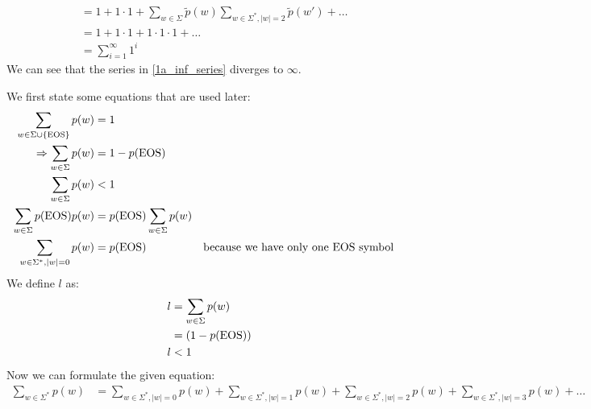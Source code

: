 \documentclass[a4paper,12pt]{ETHexercise}
\begin{document}
\begin{question}
\begin{subquestion}
\begin{align}
			                                   & = 1 + 1 \cdot 1 + \sum_{w \in \Sigma} \tilde{p}(w) \sum_{w \in \Sigma^*, |w|=2} \tilde{p}(w') + \dots                                       \\
			                                   & = 1 + 1 \cdot 1 + 1 \cdot 1 \cdot 1 + \dots                                                                                                 \\
			                                   & = \sum_{i=1}^{\infty} 1^{i}                                                                                         \label{1a_inf_series}
		\end{align}
		We can see that the series in \eqref{1a_inf_series} diverges to $\infty$.
	\end{subquestion}
	\begin{subquestion}
		We first state some equations that are used later:
		\begin{align}
			\sum_{w \in \Sigma \cup \{\text{EOS}\}} p(w) & = 1 \label{1b_sum_p}                                                                                 \\
			\Rightarrow \sum_{w \in \Sigma} p(w)   & = 1 - p(\text{EOS})                                                                                        \\
			\sum_{w \in \Sigma} p(w)               & < 1                                                                                                  \\
			\sum_{w \in \Sigma} p(\text{EOS})p(w)        & = p(\text{EOS}) \sum_{w \in \Sigma} p(w)                                                                   \\
			\sum_{w \in \Sigma^*, |w|=0} p(w)      & = p(\text{EOS})                          &  & \text{because we have only one EOS symbol} \label{1b_sum_p0} \\
		\end{align}
		We define $l$ as:
		\begin{align}
			l & = \sum_{w \in \Sigma} p(w) \label{1b_def_l} \\
			  & = (1 - p(\text{EOS})) \label{1b_def_l2}           \\
			l & < 1
		\end{align}
		Now we can formulate the given equation:
		\begin{align}
			\sum_{w \in \Sigma^*} p(w) & =  \sum_{w \in \Sigma^*, |w|=0} p(w) + \sum_{w \in \Sigma^*, |w|=1} p(w) + \sum_{w \in \Sigma^*, |w|=2} p(w) + \sum_{w \in \Sigma^*, |w|=3} p(w) + \dots                                                       \\

\end{align}
\end{subquestion}
\end{question}
\end{document}
